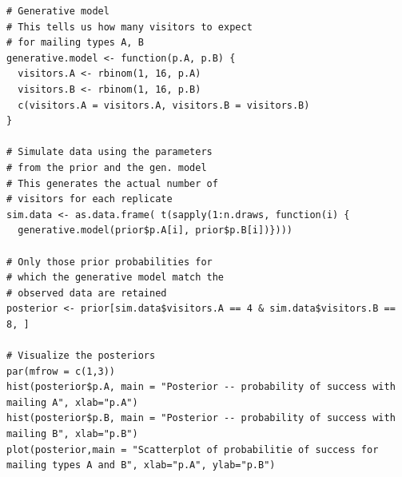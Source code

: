 \begin{Example}
\begin{lstlisting}
# Generative model
# This tells us how many visitors to expect
# for mailing types A, B 
generative.model <- function(p.A, p.B) {
  visitors.A <- rbinom(1, 16, p.A)
  visitors.B <- rbinom(1, 16, p.B)
  c(visitors.A = visitors.A, visitors.B = visitors.B)
}

# Simulate data using the parameters 
# from the prior and the gen. model
# This generates the actual number of 
# visitors for each replicate 
sim.data <- as.data.frame( t(sapply(1:n.draws, function(i) {
  generative.model(prior$p.A[i], prior$p.B[i])})))

# Only those prior probabilities for 
# which the generative model match the 
# observed data are retained
posterior <- prior[sim.data$visitors.A == 4 & sim.data$visitors.B == 8, ] 

# Visualize the posteriors
par(mfrow = c(1,3))
hist(posterior$p.A, main = "Posterior -- probability of success with mailing A", xlab="p.A") 
hist(posterior$p.B, main = "Posterior -- probability of success with mailing B", xlab="p.B")
plot(posterior,main = "Scatterplot of probabilitie of success for mailing types A and B", xlab="p.A", ylab="p.B")
\end{lstlisting}


\end{Example}

